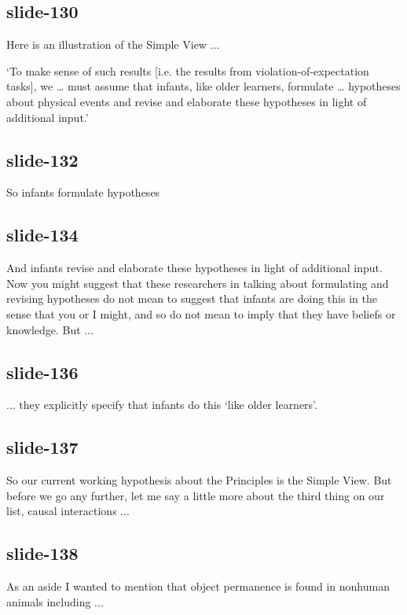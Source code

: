 \documentclass[12pt,\papersize]{extarticle}
\begin{document}
\subsection{slide-130}
Here is an illustration of the Simple View ...
 
‘To make sense of such results [i.e. the results from violation-of-expectation tasks], we … must assume that infants, like older learners, formulate … hypotheses about physical events and revise and elaborate these hypotheses in light of additional input.’
 
\subsection{slide-132}
So infants formulate hypotheses
 
\subsection{slide-134}
And infants revise and elaborate these hypotheses in light of additional input.
Now you might suggest that these researchers in talking about formulating and revising
hypotheses do not mean to suggest that infants are doing this in the sense that you or I 
might, and so do not mean to imply that they have beliefs or knowledge.  But ...
 
\subsection{slide-136}
... they explicitly specify that infants do this ‘like older learners’.
 
\subsection{slide-137}
So our current working hypothesis about the Principles is the Simple View.
But before we go any further, let me say a little more about the third thing on our list, 
causal interactions ...
 
\subsection{slide-138}
As an aside I wanted to mention that object permanence is found in nonhuman animals 
including ...
 
\end{document}
